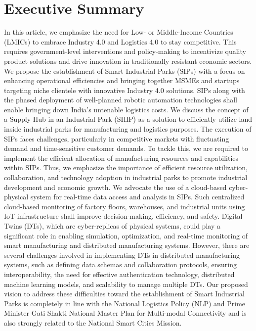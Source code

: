 \documentclass[paper=a4wide, fontsize=12pt]{scrartcl}	 %
\begin{document}
\section*{Executive Summary}

In this article, we emphasize the need for Low- or Middle-Income Countries (LMICs) to embrace Industry 4.0 and Logistics 4.0 to stay competitive. This requires government-level interventions and policy-making to incentivize quality product solutions and drive innovation in traditionally resistant economic sectors. We propose the establishment of Smart Industrial Parks (SIPs) with a focus on enhancing operational efficiencies and bringing together MSMEs and startups targeting niche clientele with innovative Industry 4.0 solutions. SIPs along with the phased deployment of well-planned robotic automation technologies shall enable bringing down India's untenable logistics costs. We discuss the concept of a Supply Hub in an Industrial Park (SHIP) as a solution to efficiently utilize land inside industrial parks for manufacturing and logistics purposes. The execution of SIPs faces challenges, particularly in competitive markets with fluctuating demand and time-sensitive customer demands. To tackle this, we are required to implement the efficient allocation of manufacturing resources and capabilities within SIPs. Thus, we emphasize the importance of efficient resource utilization, collaboration, and technology adoption in industrial parks to promote industrial development and economic growth. We advocate the use of a cloud-based cyber-physical system for real-time data access and analysis in SIPs. Such centralized cloud-based monitoring of factory floors, warehouses, and industrial units using IoT infrastructure shall improve decision-making, efficiency, and safety. Digital Twins (DTs), which are cyber-replicas of physical systems, could play a significant role in enabling simulation, optimization, and real-time monitoring of smart manufacturing and distributed manufacturing systems. However, there are several challenges involved in implementing DTs in distributed manufacturing systems, such as defining data schemas and collaboration protocols, ensuring interoperability, the need for effective authentication technology, distributed machine learning models, and scalability to manage multiple DTs. Our proposed vision to address these difficulties toward the establishment of Smart Industrial Parks is completely in line with the National Logistics Policy (NLP) and Prime Minister Gati Shakti National Master Plan for Multi-modal Connectivity and is also strongly related to the National Smart Cities Mission.
\end{document}
